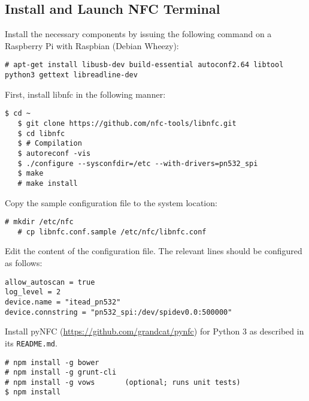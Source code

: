 \subsection{Install and Launch NFC Terminal}
Install the necessary components by issuing the following command on a Raspberry Pi with Raspbian (Debian Wheezy):
\begin{lstlisting}[breaklines=true]
   # apt-get install libusb-dev build-essential autoconf2.64 libtool python3 gettext libreadline-dev
\end{lstlisting}
%
First, install libnfc in the following manner:
\begin{lstlisting}[breaklines=true]
   $ cd ~
   $ git clone https://github.com/nfc-tools/libnfc.git
   $ cd libnfc
   $ # Compilation
   $ autoreconf -vis
   $ ./configure --sysconfdir=/etc --with-drivers=pn532_spi
   $ make
   # make install
\end{lstlisting}
Copy the sample configuration file to the system location:
\begin{lstlisting}[breaklines=true]
   # mkdir /etc/nfc
   # cp libnfc.conf.sample /etc/nfc/libnfc.conf
\end{lstlisting}


%
Edit the content of the configuration file. The relevant lines should be configured as follows:
\begin{lstlisting}[breaklines=true]
allow_autoscan = true
log_level = 2
device.name = "itead_pn532"
device.connstring = "pn532_spi:/dev/spidev0.0:500000"
\end{lstlisting}
%
Install pyNFC (\url{https://github.com/grandcat/pynfc}) for Python 3 as described in its \texttt{README.md}.


%
%
%
%
%




\begin{lstlisting}
# npm install -g bower
# npm install -g grunt-cli
# npm install -g vows		(optional; runs unit tests)
$ npm install
\end{lstlisting}

